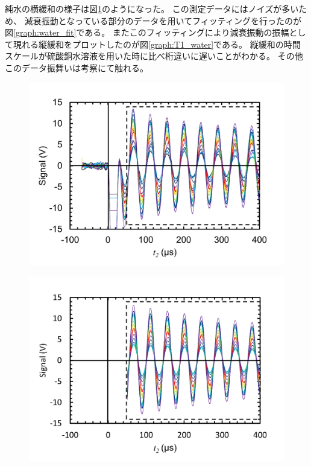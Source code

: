 \documentclass[11pt,dvipdfmx,a4paper]{jsarticle}
\begin{document}
純水の横緩和の様子は図\ref{graph:water_ex}のようになった。
この測定データにはノイズが多いため、
減衰振動となっている部分のデータを用いてフィッティングを行ったのが図\ref{graph:water_fit}である。
またこのフィッティングにより減衰振動の振幅として現れる縦緩和をプロットしたのが図\ref{graph:T1_water}である。
縦緩和の時間スケールが硫酸銅水溶液を用いた時に比べ桁違いに遅いことがわかる。
その他このデータ振舞いは考察にて触れる。
\begin{figure}[H]
	\centering
	\begin{minipage}[t]{0.48\columnwidth}
		\centering
		\includegraphics[width=\columnwidth]{graph/relaxation_water_ex.png}
		\label{graph:water_ex}
	\end{minipage}
	\hfill
	\begin{minipage}[t]{0.48\columnwidth}
		\centering
		\includegraphics[width=\columnwidth]{graph/relaxation_water_fit.png}

\end{minipage}
\end{figure}
\end{document}
